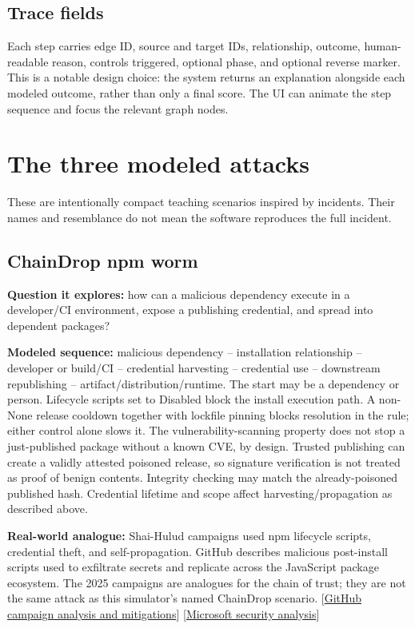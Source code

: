 \documentclass[11pt,oneside]{book}
\begin{document}
\section{Trace fields}
Each step carries edge ID, source and target IDs, relationship, outcome, human-readable reason, controls triggered, optional phase, and optional reverse marker. This is a notable design choice: the system returns an explanation alongside each modeled outcome, rather than only a final score. The UI can animate the step sequence and focus the relevant graph nodes.

\chapter{The three modeled attacks}
These are intentionally compact teaching scenarios inspired by incidents. Their names and resemblance do not mean the software reproduces the full incident.

\section{ChainDrop npm worm}
\textbf{Question it explores:} how can a malicious dependency execute in a developer/CI environment, expose a publishing credential, and spread into dependent packages?

\textbf{Modeled sequence:} malicious dependency -- installation relationship -- developer or build/CI -- credential harvesting -- credential use -- downstream republishing -- artifact/distribution/runtime. The start may be a dependency or person. Lifecycle scripts set to Disabled block the install execution path. A non-None release cooldown together with lockfile pinning blocks resolution in the rule; either control alone slows it. The vulnerability-scanning property does not stop a just-published package without a known CVE, by design. Trusted publishing can create a validly attested poisoned release, so signature verification is not treated as proof of benign contents. Integrity checking may match the already-poisoned published hash. Credential lifetime and scope affect harvesting/propagation as described above.

\textbf{Real-world analogue:} Shai-Hulud campaigns used npm lifecycle scripts, credential theft, and self-propagation. GitHub describes malicious post-install scripts used to exfiltrate secrets and replicate across the JavaScript package ecosystem. The 2025 campaigns are analogues for the chain of trust; they are not the same attack as this simulator's named ChainDrop scenario. [\href{https://github.blog/security/supply-chain-security/strengthening-supply-chain-security-preparing-for-the-next-malware-campaign/}{GitHub campaign analysis and mitigations}] [\href{https://www.microsoft.com/en-us/security/blog/2025/12/09/shai-hulud-2-0-guidance-for-detecting-investigating-and-defending-against-the-supply-chain-attack/}{Microsoft security analysis}]
\end{document}

